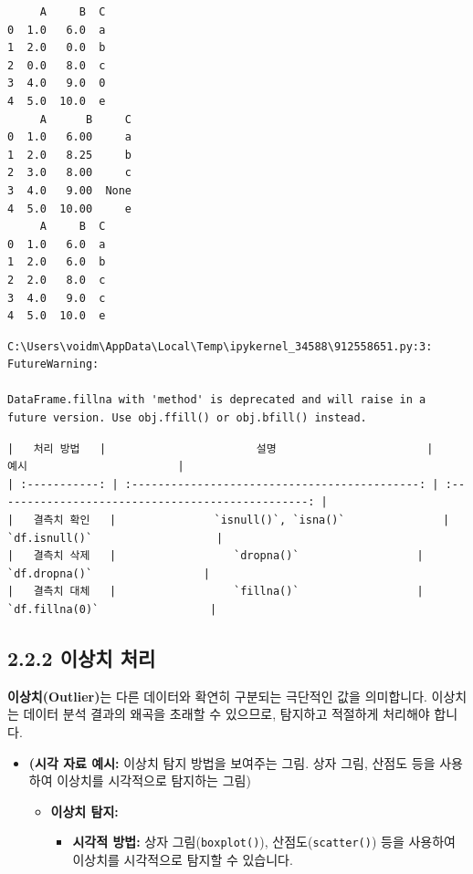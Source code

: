 \documentclass[
  letterpaper,
]{book}
\providecommand{\tightlist}{%
  \setlength{\itemsep}{0pt}\setlength{\parskip}{0pt}}
\begin{document}
\begin{verbatim}
     A     B  C
0  1.0   6.0  a
1  2.0   0.0  b
2  0.0   8.0  c
3  4.0   9.0  0
4  5.0  10.0  e
     A      B     C
0  1.0   6.00     a
1  2.0   8.25     b
2  3.0   8.00     c
3  4.0   9.00  None
4  5.0  10.00     e
     A     B  C
0  1.0   6.0  a
1  2.0   6.0  b
2  2.0   8.0  c
3  4.0   9.0  c
4  5.0  10.0  e
\end{verbatim}

\begin{verbatim}
C:\Users\voidm\AppData\Local\Temp\ipykernel_34588\912558651.py:3: FutureWarning:

DataFrame.fillna with 'method' is deprecated and will raise in a future version. Use obj.ffill() or obj.bfill() instead.
\end{verbatim}

\begin{verbatim}
|   처리 방법   |                       설명                       |                       예시                       |
| :-----------: | :--------------------------------------------: | :------------------------------------------------: |
|   결측치 확인   |               `isnull()`, `isna()`               |                   `df.isnull()`                   |
|   결측치 삭제   |                  `dropna()`                  |                 `df.dropna()`                 |
|   결측치 대체   |                  `fillna()`                  |                 `df.fillna(0)`                 |
\end{verbatim}

\subsection{2.2.2 이상치 처리}\label{uxc774uxc0c1uxce58-uxcc98uxb9ac}

\textbf{이상치(Outlier)}는 다른 데이터와 확연히 구분되는 극단적인 값을
의미합니다. 이상치는 데이터 분석 결과의 왜곡을 초래할 수 있으므로,
탐지하고 적절하게 처리해야 합니다.

\begin{itemize}
\item
  \textbf{(시각 자료 예시:} 이상치 탐지 방법을 보여주는 그림. 상자 그림,
  산점도 등을 사용하여 이상치를 시각적으로 탐지하는 그림)

  \begin{itemize}
  \tightlist
  \item
    \textbf{이상치 탐지:}

    \begin{itemize}
    \tightlist
    \item
      \textbf{시각적 방법:} 상자 그림(\texttt{boxplot()}),
      산점도(\texttt{scatter()}) 등을 사용하여 이상치를 시각적으로
      탐지할 수 있습니다.
    \end{itemize}
  \end{itemize}
\end{itemize}
\end{document}
